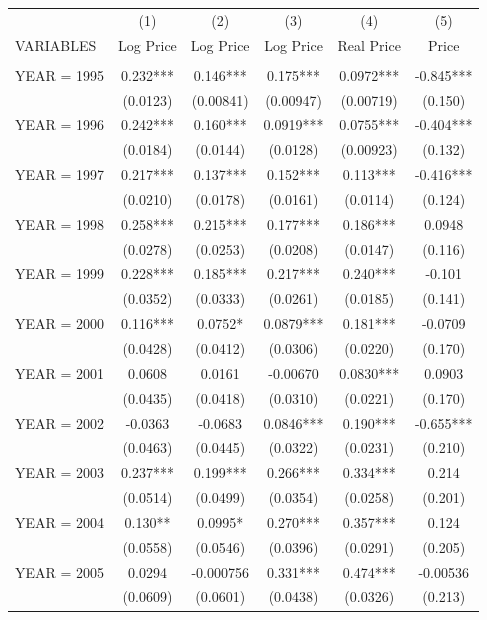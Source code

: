 \begin{tabular}{lccccc} \hline
 & (1) & (2) & (3) & (4) & (5) \\
VARIABLES & Log Price & Log Price & Log Price & Real Price & Price \\ \hline
 &  &  &  &  &  \\
YEAR = 1995 & 0.232*** & 0.146*** & 0.175*** & 0.0972*** & -0.845*** \\
 & (0.0123) & (0.00841) & (0.00947) & (0.00719) & (0.150) \\
YEAR = 1996 & 0.242*** & 0.160*** & 0.0919*** & 0.0755*** & -0.404*** \\
 & (0.0184) & (0.0144) & (0.0128) & (0.00923) & (0.132) \\
YEAR = 1997 & 0.217*** & 0.137*** & 0.152*** & 0.113*** & -0.416*** \\
 & (0.0210) & (0.0178) & (0.0161) & (0.0114) & (0.124) \\
YEAR = 1998 & 0.258*** & 0.215*** & 0.177*** & 0.186*** & 0.0948 \\
 & (0.0278) & (0.0253) & (0.0208) & (0.0147) & (0.116) \\
YEAR = 1999 & 0.228*** & 0.185*** & 0.217*** & 0.240*** & -0.101 \\
 & (0.0352) & (0.0333) & (0.0261) & (0.0185) & (0.141) \\
YEAR = 2000 & 0.116*** & 0.0752* & 0.0879*** & 0.181*** & -0.0709 \\
 & (0.0428) & (0.0412) & (0.0306) & (0.0220) & (0.170) \\
YEAR = 2001 & 0.0608 & 0.0161 & -0.00670 & 0.0830*** & 0.0903 \\
 & (0.0435) & (0.0418) & (0.0310) & (0.0221) & (0.170) \\
YEAR = 2002 & -0.0363 & -0.0683 & 0.0846*** & 0.190*** & -0.655*** \\
 & (0.0463) & (0.0445) & (0.0322) & (0.0231) & (0.210) \\
YEAR = 2003 & 0.237*** & 0.199*** & 0.266*** & 0.334*** & 0.214 \\
 & (0.0514) & (0.0499) & (0.0354) & (0.0258) & (0.201) \\
YEAR = 2004 & 0.130** & 0.0995* & 0.270*** & 0.357*** & 0.124 \\
 & (0.0558) & (0.0546) & (0.0396) & (0.0291) & (0.205) \\
YEAR = 2005 & 0.0294 & -0.000756 & 0.331*** & 0.474*** & -0.00536 \\
 & (0.0609) & (0.0601) & (0.0438) & (0.0326) & (0.213) \\

\end{tabular}
